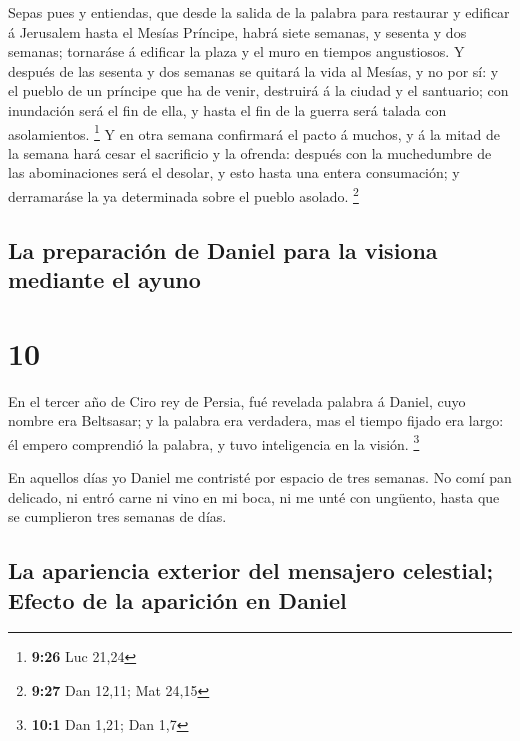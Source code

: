  Sepas pues y entiendas, que desde la salida de la palabra
para restaurar y edificar á Jerusalem hasta el Mesías Príncipe, habrá
siete semanas, y sesenta y dos semanas; tornaráse á edificar la plaza y
el muro en tiempos angustiosos.  Y después de las sesenta y
dos semanas se quitará la vida al Mesías, y no por sí: y el pueblo de un
príncipe que ha de venir, destruirá á la ciudad y el santuario; con
inundación será el fin de ella, y hasta el fin de la guerra será talada
con asolamientos. \footnote{\textbf{9:26} Luc 21,24}  Y en
otra semana confirmará el pacto á muchos, y á la mitad de la semana hará
cesar el sacrificio y la ofrenda: después con la muchedumbre de las
abominaciones será el desolar, y esto hasta una entera consumación; y
derramaráse la ya determinada sobre el pueblo asolado. \footnote{\textbf{9:27}
  Dan 12,11; Mat 24,15}

\hypertarget{la-preparaciuxf3n-de-daniel-para-la-visiona-mediante-el-ayuno}{%
\subsection{La preparación de Daniel para la visiona mediante el
ayuno}\label{la-preparaciuxf3n-de-daniel-para-la-visiona-mediante-el-ayuno}}

\hypertarget{section-9}{%
\section{10}\label{section-9}}

 En el tercer año de Ciro rey de Persia, fué revelada
palabra á Daniel, cuyo nombre era Beltsasar; y la palabra era verdadera,
mas el tiempo fijado era largo: él empero comprendió la palabra, y tuvo
inteligencia en la visión. \footnote{\textbf{10:1} Dan 1,21; Dan 1,7}

 En aquellos días yo Daniel me contristé por espacio de tres
semanas.  No comí pan delicado, ni entró carne ni vino en mi
boca, ni me unté con ungüento, hasta que se cumplieron tres semanas de
días.

\hypertarget{la-apariencia-exterior-del-mensajero-celestial-efecto-de-la-apariciuxf3n-en-daniel}{%
\subsection{La apariencia exterior del mensajero celestial; Efecto de la
aparición en
Daniel}\label{la-apariencia-exterior-del-mensajero-celestial-efecto-de-la-apariciuxf3n-en-daniel}}

